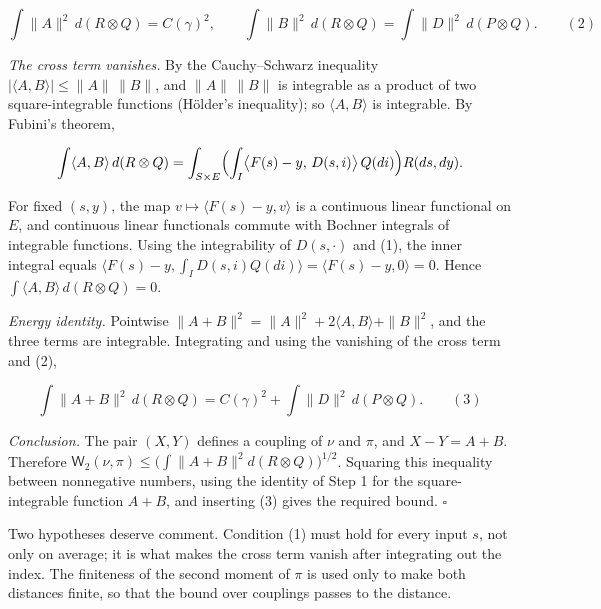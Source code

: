 \documentclass[11pt,a4paper]{report}
\begin{document}
\[\int\|A\|^2\,d(R\otimes Q)=C(\gamma)^2,\qquad\int\|B\|^2\,d(R\otimes Q)=\int\|D\|^2\,d(P\otimes Q).\qquad(2)\]


\emph{The cross term vanishes.} By the Cauchy–Schwarz inequality \(|\langle A,B\rangle|\le\|A\|\,\|B\|\), and \(\|A\|\,\|B\|\) is integrable as a product of two square-integrable functions (Hölder's inequality); so \(\langle A,B\rangle\) is integrable. By Fubini's theorem,


\[\int\langle A,B\rangle\,d(R\otimes Q)=\int_{S\times E}\Bigl(\int_I\bigl\langle F(s)-y,\,D(s,i)\bigr\rangle\,Q(di)\Bigr)R(ds,dy).\]


For fixed \((s,y)\), the map \(v\mapsto\langle F(s)-y,v\rangle\) is a continuous linear functional on \(E\), and continuous linear functionals commute with Bochner integrals of integrable functions. Using the integrability of \(D(s,\cdot)\) and (1), the inner integral equals \(\langle F(s)-y,\int_ID(s,i)Q(di)\rangle=\langle F(s)-y,0\rangle=0\). Hence \(\int\langle A,B\rangle\,d(R\otimes Q)=0\).




\emph{Energy identity.} Pointwise \(\|A+B\|^2=\|A\|^2+2\langle A,B\rangle+\|B\|^2\), and the three terms are integrable. Integrating and using the vanishing of the cross term and (2),


\[\int\|A+B\|^2\,d(R\otimes Q)=C(\gamma)^2+\int\|D\|^2\,d(P\otimes Q).\qquad(3)\]


\emph{Conclusion.} The pair \((X,Y)\) defines a coupling of \(\nu\) and \(\pi\), and \(X-Y=A+B\). Therefore \(\mathsf W_2(\nu,\pi)\le\bigl(\int\|A+B\|^2d(R\otimes Q)\bigr)^{1/2}\). Squaring this inequality between nonnegative numbers, using the identity of Step 1 for the square-integrable function \(A+B\), and inserting (3) gives the required bound. \(\square\)




Two hypotheses deserve comment. Condition (1) must hold for every input \(s\), not only on average; it is what makes the cross term vanish after integrating out the index. The finiteness of the second moment of \(\pi\) is used only to make both distances finite, so that the bound over couplings passes to the distance.
\end{document}
